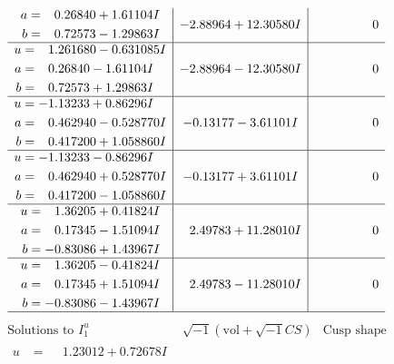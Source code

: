 \documentclass[1p]{elsarticle_modified}
\theoremstyle{definition}
\newcommand{\I}{\sqrt{-1}}
\begin{document}
$$\begin{array}{c|c|c}
\begin{aligned}
a &= \phantom{-}0.26840 + 1.61104 I \\
b &= \phantom{-}0.72573 - 1.29863 I\end{aligned}
 & -2.88964 + 12.30580 I & \phantom{-0.000000 } 0 \\ \hline\begin{aligned}
u &= \phantom{-}1.261680 - 0.631085 I \\
a &= \phantom{-}0.26840 - 1.61104 I \\
b &= \phantom{-}0.72573 + 1.29863 I\end{aligned}
 & -2.88964 - 12.30580 I & \phantom{-0.000000 } 0 \\ \hline\begin{aligned}
u &= -1.13233 + 0.86296 I \\
a &= \phantom{-}0.462940 - 0.528770 I \\
b &= \phantom{-}0.417200 + 1.058860 I\end{aligned}
 & -0.13177 - 3.61101 I & \phantom{-0.000000 } 0 \\ \hline\begin{aligned}
u &= -1.13233 - 0.86296 I \\
a &= \phantom{-}0.462940 + 0.528770 I \\
b &= \phantom{-}0.417200 - 1.058860 I\end{aligned}
 & -0.13177 + 3.61101 I & \phantom{-0.000000 } 0 \\ \hline\begin{aligned}
u &= \phantom{-}1.36205 + 0.41824 I \\
a &= \phantom{-}0.17345 - 1.51094 I \\
b &= -0.83086 + 1.43967 I\end{aligned}
 & \phantom{-}2.49783 + 11.28010 I & \phantom{-0.000000 } 0 \\ \hline\begin{aligned}
u &= \phantom{-}1.36205 - 0.41824 I \\
a &= \phantom{-}0.17345 + 1.51094 I \\
b &= -0.83086 - 1.43967 I\end{aligned}
 & \phantom{-}2.49783 - 11.28010 I & \phantom{-0.000000 } 0\\
 \hline 
 \end{array}$$\newpage$$\begin{array}{c|c|c}  
\text{Solutions to }I^u_{1}& \I (\text{vol} + \sqrt{-1}CS) & \text{Cusp shape}\\
 \hline 
\begin{aligned}
u &= \phantom{-}1.23012 + 0.72678 I \\

\end{aligned}
\end{array}$$
\end{document}
